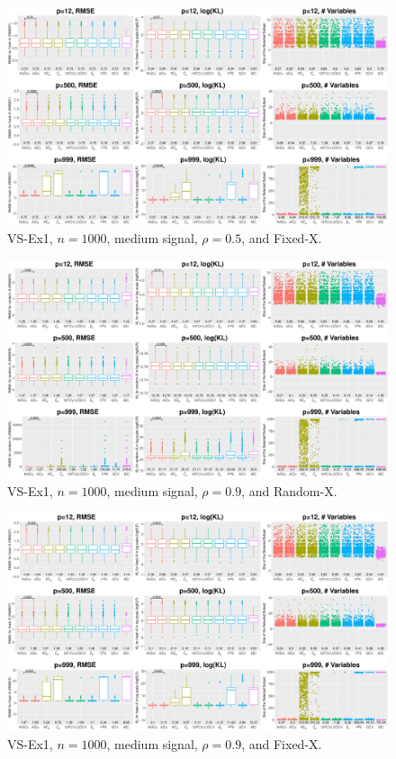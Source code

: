 \begin{figure}[!ht]
\centering
\includegraphics[width=\textwidth]{figures/supplement/fixedx_VS-Ex1_n1000_msnr_rho05.eps}
\caption{VS-Ex1, $n=1000$, medium signal, $\rho=0.5$, and Fixed-X.}
\end{figure}
\clearpage
\begin{figure}[!ht]
\centering
\includegraphics[width=\textwidth]{figures/supplement/randomx_VS-Ex1_n1000_msnr_rho09.eps}
\caption{VS-Ex1, $n=1000$, medium signal, $\rho=0.9$, and Random-X.}
\end{figure}
\begin{figure}[!ht]
\centering
\includegraphics[width=\textwidth]{figures/supplement/fixedx_VS-Ex1_n1000_msnr_rho09.eps}
\caption{VS-Ex1, $n=1000$, medium signal, $\rho=0.9$, and Fixed-X.}
\end{figure}

